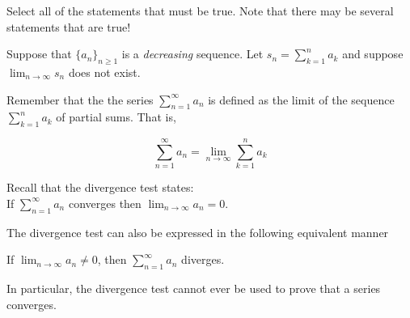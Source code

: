 \documentclass{ximera}
\author{Jim Talamo and Jason Miller}
\begin{document}
\begin{exercise}

Select all of the statements that must be true.  Note that there may be several statements that are true! 

 Suppose that $\displaystyle\{a_n\}_{n \geq 1}$ is a \emph{decreasing} sequence.  Let $s_n =\displaystyle  \sum^n_{k=1} a_k$ and suppose $\displaystyle \lim_{n \rightarrow \infty} s_n$ does  not exist.


\begin{selectAll}
\end{selectAll}

\begin{hint}
Remember that the the series $\sum^{\infty}_{n=1} a_n$ is defined as the limit of the sequence $\sum^{n}_{k=1} a_k$ of partial sums. That is, 

\[
\sum^{\infty}_{n=1} a_n = \lim_{n \to \infty} \sum^n_{k=1} a_k
\]
\end{hint}


\begin{hint}
Recall that the divergence test states: \\
If $\sum^{\infty}_{n=1} a_n $ converges then $\lim_{n \to \infty} a_n=0$. 

The divergence test can also be expressed in the following equivalent manner

If $\lim_{n \to \infty} a_n \neq 0$, then $\sum^{\infty}_{n=1} a_n$ diverges. 

In particular, the divergence test cannot ever be used to prove that a series converges.
\end{hint}





\end{exercise}
\end{document}
